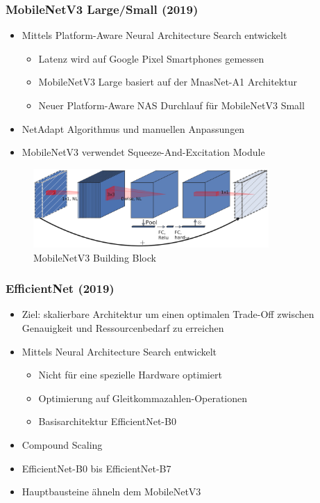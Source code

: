 \documentclass{beamer}
\begin{document}
\begin{frame}
\frametitle{MobileNetV3 Large/Small (2019) \cite{howard_searching_2019}}

\begin{itemize}
	\item Mittels Platform-Aware Neural Architecture Search entwickelt
	\begin{itemize}
		\item Latenz wird auf Google Pixel Smartphones gemessen
		\item MobileNetV3 Large basiert auf der MnasNet-A1 Architektur
		\item Neuer Platform-Aware NAS Durchlauf für MobileNetV3 Small
	\end{itemize}
	\item NetAdapt Algorithmus und manuellen Anpassungen
	\item MobileNetV3 verwendet Squeeze-And-Excitation Module
\end{itemize}

\begin{figure}
\includegraphics[width=0.8\textwidth]{img/mobilenetv3_block.png}
\caption{MobileNetV3 Building Block \cite{howard_searching_2019}}
\end{figure}

\end{frame}


\begin{frame}
\frametitle{EfficientNet (2019) \cite{tan_efficientnet_2020}}

\begin{itemize}
	\item Ziel: skalierbare Architektur um einen optimalen Trade-Off zwischen Genauigkeit und Ressourcenbedarf zu erreichen
	\item Mittels Neural Architecture Search entwickelt
	\begin{itemize}
		\item Nicht für eine spezielle Hardware optimiert
		\item Optimierung auf Gleitkommazahlen-Operationen
		\item Basisarchitektur EfficientNet-B0
	\end{itemize}
	\item Compound Scaling
	\item EfficientNet-B0 bis EfficientNet-B7
	\item Hauptbausteine ähneln dem MobileNetV3
\end{itemize}

\end{frame}
\end{document}
